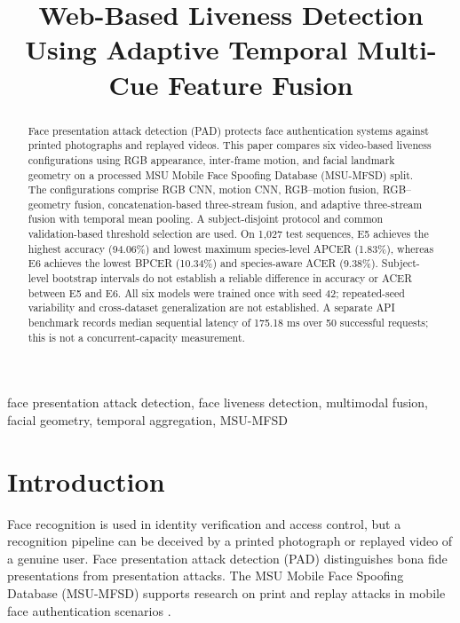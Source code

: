 \documentclass[a4paper,conference]{IEEEtran}
\begin{document}
\title{Web-Based Liveness Detection Using Adaptive Temporal Multi-Cue Feature Fusion}

\author{
}

\maketitle
\begin{abstract}
Face presentation attack detection (PAD) protects face authentication systems against printed photographs and replayed videos. This paper compares six video-based liveness configurations using RGB appearance, inter-frame motion, and facial landmark geometry on a processed MSU Mobile Face Spoofing Database (MSU-MFSD) split. The configurations comprise RGB CNN, motion CNN, RGB--motion fusion, RGB--geometry fusion, concatenation-based three-stream fusion, and adaptive three-stream fusion with temporal mean pooling. A subject-disjoint protocol and common validation-based threshold selection are used. On 1,027 test sequences, E5 achieves the highest accuracy (94.06\%) and lowest maximum species-level APCER (1.83\%), whereas E6 achieves the lowest BPCER (10.34\%) and species-aware ACER (9.38\%). Subject-level bootstrap intervals do not establish a reliable difference in accuracy or ACER between E5 and E6. All six models were trained once with seed 42; repeated-seed variability and cross-dataset generalization are not established. A separate API benchmark records median sequential latency of 175.18 ms over 50 successful requests; this is not a concurrent-capacity measurement.
\end{abstract}
\begin{IEEEkeywords}
face presentation attack detection, face liveness detection, multimodal fusion, facial geometry, temporal aggregation, MSU-MFSD
\end{IEEEkeywords}

\section{Introduction}
Face recognition is used in identity verification and access control, but a recognition pipeline can be deceived by a printed photograph or replayed video of a genuine user. Face presentation attack detection (PAD) distinguishes bona fide presentations from presentation attacks. The MSU Mobile Face Spoofing Database (MSU-MFSD) supports research on print and replay attacks in mobile face authentication scenarios \cite{wen2015ida}.
\end{document}
